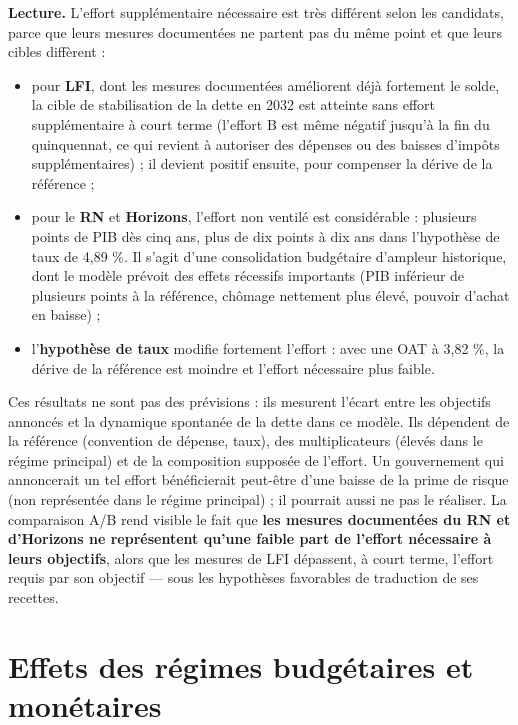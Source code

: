 \documentclass[
  11pt,
  11pt,
  a4paper,
  openany]{book}
\providecommand{\tightlist}{%
  \setlength{\itemsep}{0pt}\setlength{\parskip}{0pt}}
\begin{document}
\textbf{Lecture.} L'effort supplémentaire nécessaire est très différent
selon les candidats, parce que leurs mesures documentées ne partent pas
du même point et que leurs cibles diffèrent :

\begin{itemize}
\tightlist
\item
  pour \textbf{LFI}, dont les mesures documentées améliorent déjà
  fortement le solde, la cible de stabilisation de la dette en 2032 est
  atteinte sans effort supplémentaire à court terme (l'effort B est même
  négatif jusqu'à la fin du quinquennat, ce qui revient à autoriser des
  dépenses ou des baisses d'impôts supplémentaires) ; il devient positif
  ensuite, pour compenser la dérive de la référence ;
\item
  pour le \textbf{RN} et \textbf{Horizons}, l'effort non ventilé est
  considérable : plusieurs points de PIB dès cinq ans, plus de dix
  points à dix ans dans l'hypothèse de taux de 4,89 \%. Il s'agit d'une
  consolidation budgétaire d'ampleur historique, dont le modèle prévoit
  des effets récessifs importants (PIB inférieur de plusieurs points à
  la référence, chômage nettement plus élevé, pouvoir d'achat en baisse)
  ;
\item
  l'\textbf{hypothèse de taux} modifie fortement l'effort : avec une OAT
  à 3,82 \%, la dérive de la référence est moindre et l'effort
  nécessaire plus faible.
\end{itemize}

Ces résultats ne sont pas des prévisions : ils mesurent l'écart entre
les objectifs annoncés et la dynamique spontanée de la dette dans ce
modèle. Ils dépendent de la référence (convention de dépense, taux), des
multiplicateurs (élevés dans le régime principal) et de la composition
supposée de l'effort. Un gouvernement qui annoncerait un tel effort
bénéficierait peut-être d'une baisse de la prime de risque (non
représentée dans le régime principal) ; il pourrait aussi ne pas le
réaliser. La comparaison A/B rend visible le fait que \textbf{les
mesures documentées du RN et d'Horizons ne représentent qu'une faible
part de l'effort nécessaire à leurs objectifs}, alors que les mesures de
LFI dépassent, à court terme, l'effort requis par son objectif --- sous
les hypothèses favorables de traduction de ses recettes.

\hypertarget{sec:effets-regimes}{%
\section{Effets des régimes budgétaires et
monétaires}\label{sec:effets-regimes}}
\end{document}
